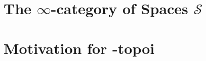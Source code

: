 \documentclass[a4paper,10pt]{scrartcl}
\theoremstyle{plain}
\newcommand{\spaces}{\mathcal{S}}
\newcommand{\inftycat}{}
\def\inftycat/{$\infty$-category}
\begin{document}
    \section{The \inftycat/ of Spaces $\spaces$}
    
    \section{Motivation for \infty-topoi}
    
\end{document}
